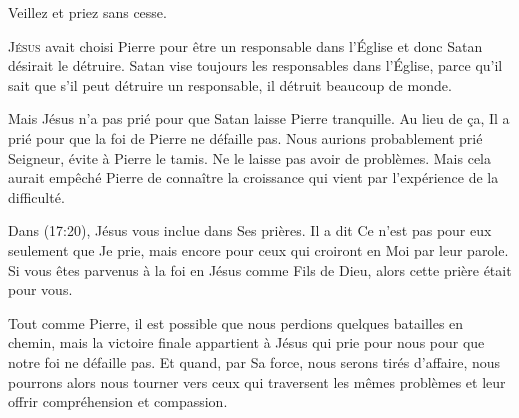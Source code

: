 Veillez et priez \ocadr sans cesse.

\dvrule







\lettrine{J}{ésus} avait choisi Pierre pour être un responsable
 dans l'Église
 et donc Satan désirait le détruire.
 Satan vise toujours les responsables dans l'Église,
 parce qu'il sait que s'il peut détruire un responsable,
 il détruit beaucoup de monde.

Mais Jésus n'a pas prié pour que Satan laisse Pierre tranquille.
 Au lieu de \c{c}a, Il a prié pour que la foi de Pierre ne défaille pas.
 Nous aurions probablement prié\frcolon{} \Og Seigneur, évite à Pierre le tamis.
 Ne le laisse pas avoir de problèmes. \Fg{}
 Mais cela aurait empêché Pierre de connaître la croissance qui vient
 par l'expérience de la difficulté.


Dans (17:20), Jésus vous inclue dans Ses prières.
 Il a dit\frcolon{} 
 \Og Ce n'est pas pour eux seulement que Je prie, mais encore pour ceux
 qui croiront en Moi par leur parole. \Fg{}
 Si vous êtes parvenus à la foi en Jésus comme Fils de Dieu,
 alors cette prière était pour vous.

Tout comme Pierre, il est possible que nous perdions quelques batailles
 en chemin, mais la victoire  finale appartient à Jésus
 qui prie pour nous pour que notre foi ne défaille pas.
 Et quand, par Sa force, nous serons tirés d'affaire,
 nous pourrons alors nous tourner vers ceux qui traversent
 les mêmes problèmes et leur offrir compréhension et compassion.

\dvrule

